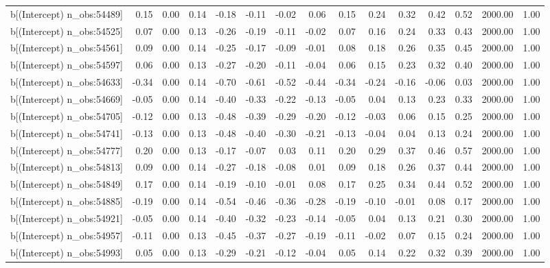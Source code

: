 \begin{table}[ht]
\begin{tabular}{rrrrrrrrrrrrrrr}
  b[(Intercept) n\_obs:54489] & 0.15 & 0.00 & 0.14 & -0.18 & -0.11 & -0.02 & 0.06 & 0.15 & 0.24 & 0.32 & 0.42 & 0.52 & 2000.00 & 1.00 \\ 
  b[(Intercept) n\_obs:54525] & 0.07 & 0.00 & 0.13 & -0.26 & -0.19 & -0.11 & -0.02 & 0.07 & 0.16 & 0.24 & 0.33 & 0.43 & 2000.00 & 1.00 \\ 
  b[(Intercept) n\_obs:54561] & 0.09 & 0.00 & 0.14 & -0.25 & -0.17 & -0.09 & -0.01 & 0.08 & 0.18 & 0.26 & 0.35 & 0.45 & 2000.00 & 1.00 \\ 
  b[(Intercept) n\_obs:54597] & 0.06 & 0.00 & 0.13 & -0.27 & -0.20 & -0.11 & -0.04 & 0.06 & 0.15 & 0.23 & 0.32 & 0.40 & 2000.00 & 1.00 \\ 
  b[(Intercept) n\_obs:54633] & -0.34 & 0.00 & 0.14 & -0.70 & -0.61 & -0.52 & -0.44 & -0.34 & -0.24 & -0.16 & -0.06 & 0.03 & 2000.00 & 1.00 \\ 
  b[(Intercept) n\_obs:54669] & -0.05 & 0.00 & 0.14 & -0.40 & -0.33 & -0.22 & -0.13 & -0.05 & 0.04 & 0.13 & 0.23 & 0.33 & 2000.00 & 1.00 \\ 
  b[(Intercept) n\_obs:54705] & -0.12 & 0.00 & 0.13 & -0.48 & -0.39 & -0.29 & -0.20 & -0.12 & -0.03 & 0.06 & 0.15 & 0.25 & 2000.00 & 1.00 \\ 
  b[(Intercept) n\_obs:54741] & -0.13 & 0.00 & 0.13 & -0.48 & -0.40 & -0.30 & -0.21 & -0.13 & -0.04 & 0.04 & 0.13 & 0.24 & 2000.00 & 1.00 \\ 
  b[(Intercept) n\_obs:54777] & 0.20 & 0.00 & 0.13 & -0.17 & -0.07 & 0.03 & 0.11 & 0.20 & 0.29 & 0.37 & 0.46 & 0.57 & 2000.00 & 1.00 \\ 
  b[(Intercept) n\_obs:54813] & 0.09 & 0.00 & 0.14 & -0.27 & -0.18 & -0.08 & 0.01 & 0.09 & 0.18 & 0.26 & 0.37 & 0.44 & 2000.00 & 1.00 \\ 
  b[(Intercept) n\_obs:54849] & 0.17 & 0.00 & 0.14 & -0.19 & -0.10 & -0.01 & 0.08 & 0.17 & 0.25 & 0.34 & 0.44 & 0.52 & 2000.00 & 1.00 \\ 
  b[(Intercept) n\_obs:54885] & -0.19 & 0.00 & 0.14 & -0.54 & -0.46 & -0.36 & -0.28 & -0.19 & -0.10 & -0.01 & 0.08 & 0.17 & 2000.00 & 1.00 \\ 
  b[(Intercept) n\_obs:54921] & -0.05 & 0.00 & 0.14 & -0.40 & -0.32 & -0.23 & -0.14 & -0.05 & 0.04 & 0.13 & 0.21 & 0.30 & 2000.00 & 1.00 \\ 
  b[(Intercept) n\_obs:54957] & -0.11 & 0.00 & 0.13 & -0.45 & -0.37 & -0.27 & -0.19 & -0.11 & -0.02 & 0.07 & 0.15 & 0.24 & 2000.00 & 1.00 \\ 
  b[(Intercept) n\_obs:54993] & 0.05 & 0.00 & 0.13 & -0.29 & -0.21 & -0.12 & -0.04 & 0.05 & 0.14 & 0.22 & 0.32 & 0.39 & 2000.00 & 1.00 \\ 

\end{tabular}
\end{table}
